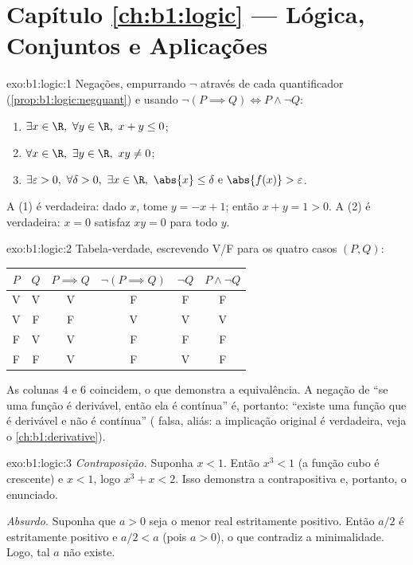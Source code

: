 \section*{Capítulo \ref{ch:b1:logic} --- Lógica, Conjuntos e Aplicações}

\begin{solution}{exo:b1:logic:1}
Negações, empurrando $\lnot$ através de cada quantificador
(\cref{prop:b1:logic:negquant}) e usando $\lnot(P \implies Q) \iff
P \land \lnot Q$:
\begin{enumerate}
  \item $\exists x \in \R,\ \forall y \in \R,\ x + y \leq 0$;
  \item $\forall x \in \R,\ \exists y \in \R,\ xy \neq 0$;
  \item $\exists \varepsilon > 0,\ \forall \delta > 0,\ \exists x \in
        \R,\ \abs{x} \leq \delta \text{ e } \abs{f(x)} >
        \varepsilon$.
\end{enumerate}
A  (1) é verdadeira: dado $x$, tome $y = -x + 1$; então $x + y = 1 >
0$. A  (2) é verdadeira: $x = 0$ satisfaz $xy = 0$ para todo $y$.
\end{solution}

\begin{solution}{exo:b1:logic:2}
Tabela-verdade, escrevendo V/F para os quatro casos $(P, Q)$:
\begin{center}
\begin{tabular}{cc|c|c|c|c}
$P$ & $Q$ & $P \implies Q$ & $\lnot(P \implies Q)$ & $\lnot Q$ &
$P \land \lnot Q$ \\
\hline
V & V & V & F & F & F \\
V & F & F & V & V & V \\
F & V & V & F & F & F \\
F & F & V & F & V & F \\
\end{tabular}
\end{center}
As colunas $4$ e $6$ coincidem, o que demonstra a equivalência. A negação de
``se uma função é derivável, então ela é contínua'' é, portanto:
``existe uma função que é derivável e não é contínua''
( falsa, aliás: a implicação original é verdadeira,
veja o \cref{ch:b1:derivative}).
\end{solution}

\begin{solution}{exo:b1:logic:3}
\emph{Contraposição.} Suponha $x < 1$. Então $x^3 < 1$ (a função cubo
é crescente) e $x < 1$, logo $x^3 + x < 2$. Isso demonstra a
contrapositiva e, portanto, o enunciado.

\emph{Absurdo.} Suponha que $a > 0$ seja o menor real estritamente
positivo. Então $a/2$ é estritamente positivo e $a/2 < a$ (pois $a > 0$),
o que contradiz a minimalidade. Logo, tal $a$ não existe.
\end{solution}

